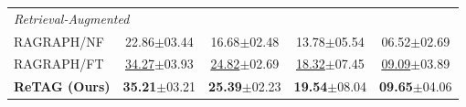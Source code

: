 \begin{table}[t]
\begin{tabular}{lcccc}
\multicolumn{5}{l}{\textit{Retrieval-Augmented}} \\
RAGRAPH/NF   & 22.86$\pm$03.44 & 16.68$\pm$02.48 & 13.78$\pm$05.54 & 06.52$\pm$02.69 \\
RAGRAPH/FT   & \underline{34.27}$\pm$03.93 & \underline{24.82}$\pm$02.69 
              & \underline{18.32}$\pm$07.45 & \underline{09.09}$\pm$03.89 \\
\addlinespace[0.3ex]
\midrule

\textbf{ReTAG (Ours)}
 & \textbf{35.21}$\pm$03.21 & \textbf{25.39}$\pm$02.23
 & \textbf{19.54}$\pm$08.04 & \textbf{09.65}$\pm$04.06 \\
\bottomrule
\end{tabular}
\end{table}


















